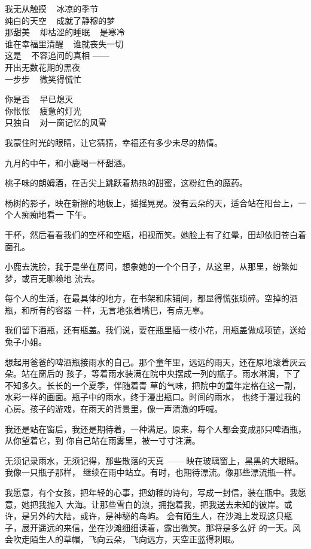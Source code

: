		我无从触摸 ~ 冰凉的季节 \\
		纯白的天空 ~ 成就了静穆的梦 \\
		那甜美 ~ 却枯涩的睡眠 ~ 是寒冷 \\
		谁在幸福里清醒 ~ 谁就丧失一切 \\
		这是 ~ 不容追问的真相 —— \\
		开出无数花期的黑夜 \\
		一步步 ~ 微笑得慌忙

		你是否 ~ 早已熄灭 \\
		你怅怅 ~ 疲惫的灯光 \\
		只独自 ~ 对一窗记忆的风雪

	\endlongpoem
	\endwriting



		我蒙住时光的眼睛，让它猜猜，幸福还有多少未尽的热情。

		九月的中午，和小鹿喝一杯甜酒。

		桃子味的朗姆酒，在舌尖上跳跃着热热的甜蜜，这粉红色的魔药。

		杨树的影子，映在新擦的地板上，摇摇晃晃。没有云朵的天，适合站在阳台上，一个人痴痴地看一
	下午。

		干杯，然后看看我们的空杯和空瓶，相视而笑。她脸上有了红晕，田却依旧苍白着面孔。

		小鹿去洗脸，我于是坐在房间，想象她的一个个日子，从这里，从那里，纷繁如梦，或百无聊赖地
	流去。

		每个人的生活，在最具体的地方，在书架和床铺间，都显得慌张琐碎。空掉的酒瓶，和所有的容器
	一样，无言地张着嘴巴，有点无辜。

		我们留下酒瓶，还有瓶盖。我们说，要在瓶里插一枝小花，用瓶盖做成项链，送给兔子小姐。

		想起用爸爸的啤酒瓶接雨水的自己。那个童年里，远远的雨天，还在原地滚着灰云朵。站在窗后的
	孩子，等着雨水装满在院中央摆成一列的瓶子。雨水淋漓，下了不知多久。长长的一个夏季，伴随着青
	草的气味，把院中的童年定格在这一副，水彩一样的画面。瓶子中的雨水，终于漫出瓶口。时间的雨水，
	也终于漫过我的心房。孩子的游戏，在雨天的背景里，像一声清澈的呼喊。

		我还是站在窗后，我还是期待着，一种满足。原来，每个人都会变成那只啤酒瓶，从你望着它，到
	你自己站在雨雾里，被一寸寸注满。

		无须记录雨水，无须记得，那些散落的天真 —— 映在玻璃窗上，黑黑的大眼睛。我像一只瓶子那样，
	继续在雨中站立。有时，也期待漂流。像那些漂流瓶一样。

		我愿意，有个女孩，把年轻的心事，把幼稚的诗句，写成一封信，装在瓶中。我愿意，她把我抛入
	大海。让那些雪白的浪，拥抱着我，把我送去未知的彼岸。或许，是另外的大陆，或许，是神秘的岛屿。
	会有陌生人，在沙滩上发现这只瓶子，展开遥远的来信，坐在沙滩细细读着，露出微笑。那将是多么好
	的一天。风会吹走陌生人的草帽，飞向云朵，飞向远方，天空正蓝得刺眼。

